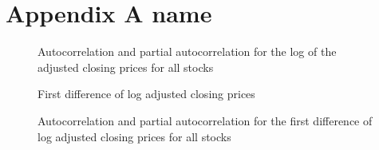\chapter{Appendix A name}\label{ch:appAlabel}

\begin{figure}[h]
    \centering
    \begin{adjustbox}{width=.85\textwidth,center}
    
    \end{adjustbox}  
    \caption{Autocorrelation and partial autocorrelation for the log of the adjusted closing prices for all stocks}
    \label{fig:acf_pacf_log_adjclose}
\end{figure}{}


\begin{figure}[h]
    \centering
    \begin{adjustbox}{width=.9\textwidth,center}
    
    \end{adjustbox}  
    \caption{First difference of log adjusted closing prices}
    \label{fig:all_fd_log_adjclose}
\end{figure}{}


\begin{figure}[H]
    \centering
    \begin{adjustbox}{width=.9\textwidth,center}
    
    \end{adjustbox}  
    \caption{Autocorrelation and partial autocorrelation for the first difference of log adjusted closing prices for all stocks}
    \label{fig:all_autocorr_fd_log_adjclose}
\end{figure}{}


